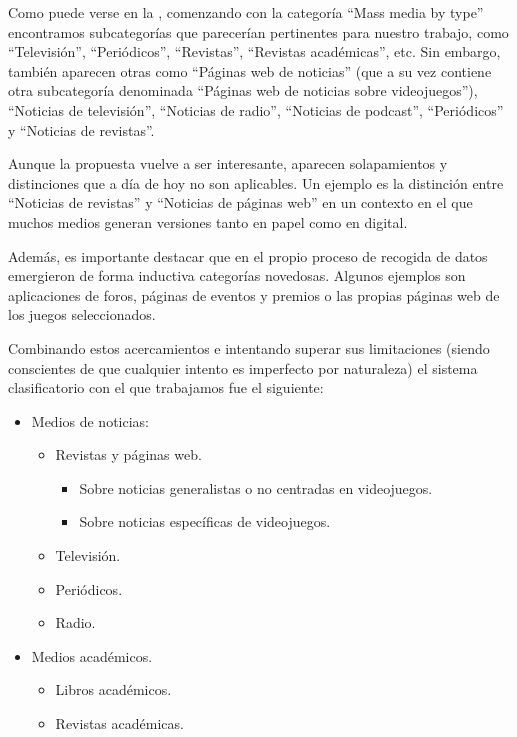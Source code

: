 \documentclass[spanish]{textolivre}
\begin{document}
Como puede verse en la , comenzando con la categoría “Mass media by type” encontramos subcategorías que parecerían pertinentes para nuestro trabajo, como “Televisión”, “Periódicos”, “Revistas”, “Revistas académicas”, etc. Sin embargo, también aparecen otras como “Páginas web de noticias” (que a su vez contiene otra subcategoría denominada “Páginas web de noticias sobre videojuegos”), “Noticias de televisión”, “Noticias de radio”, “Noticias de podcast”, “Periódicos” y “Noticias de revistas”.

Aunque la propuesta vuelve a ser interesante, aparecen solapamientos y distinciones que a día de hoy no son aplicables. Un ejemplo es la distinción entre “Noticias de revistas” y “Noticias de páginas web” en un contexto en el que muchos medios generan versiones tanto en papel como en digital.

Además, es importante destacar que en el propio proceso de recogida de datos emergieron de forma inductiva categorías novedosas. Algunos ejemplos son aplicaciones de foros, páginas de eventos y premios o las propias páginas web de los juegos seleccionados.

Combinando estos acercamientos e intentando superar sus limitaciones (siendo conscientes de que cualquier intento es imperfecto por naturaleza) el sistema clasificatorio con el que trabajamos fue el siguiente:

\begin{itemize}
  \item Medios de noticias:
  \begin{itemize}
    \item Revistas y páginas web.
    \begin{itemize}
      \item Sobre noticias generalistas o no centradas en videojuegos.
      \item Sobre noticias específicas de videojuegos.
    \end{itemize}
    \item Televisión.
    \item Periódicos.
    \item Radio.
  \end{itemize}
\end{itemize}

\begin{itemize}
  \item Medios académicos.
  \begin{itemize}
    \item Libros académicos.
    \item Revistas académicas.
  \end{itemize}
\end{itemize}
\end{document}
